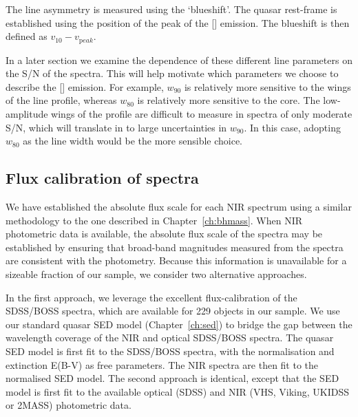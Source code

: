 The line asymmetry is measured using the `blueshift'. 
The quasar rest-frame is established using the position of the peak of the [] emission. 
The blueshift is then defined as $v_{10}-v_{\mathrm peak}$. 

In a later section we examine the dependence of these different line parameters on the \ac{S/N} of the spectra. 
This will help motivate which parameters we choose to describe the [] emission. 
For example, $w_90$ is relatively more sensitive to the wings of the line profile, whereas $w_80$ is relatively more sensitive to the core. 
The low-amplitude wings of the profile are difficult to measure in spectra of only moderate \ac{S/N}, which will translate in to large uncertainties in $w_{90}$. 
In this case, adopting $w_{80}$ as the line width would be the more sensible choice.   

\subsection{Flux calibration of spectra}

We have established the absolute flux scale for each \ac{NIR} spectrum using a similar methodology to the one described in Chapter~\ref{ch:bhmass}. 
When \ac{NIR} photometric data is available, the absolute flux scale of the spectra may be established by ensuring that broad-band magnitudes measured from the spectra are consistent with the photometry. 
Because this information is unavailable for a sizeable fraction of our sample, we consider two alternative approaches. 

In the first approach, we leverage the excellent flux-calibration of the \ac{SDSS}/\ac{BOSS} spectra, which are available for 229 objects in our sample. 
We use our standard quasar \ac{SED} model (Chapter~\ref{ch:sed}) to bridge the gap between the wavelength coverage of the \ac{NIR} and optical \ac{SDSS}/\ac{BOSS} spectra.
The quasar \ac{SED} model is first fit to the \ac{SDSS}/\ac{BOSS} spectra, with the normalisation and extinction E(B-V) as free parameters. 
The \ac{NIR} spectra are then fit to the normalised \ac{SED} model. 
 The second approach is identical, except that the \ac{SED} model is first fit to the available optical (\ac{SDSS}) and \ac{NIR} (VHS, Viking, UKIDSS or 2MASS) photometric data.  


